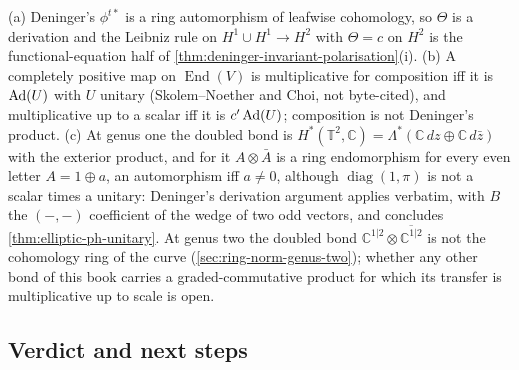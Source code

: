 \begin{proposition}
\label{prop:deninger-product-genus-one}
(a) Deninger's $\phi^{t*}$ is a ring automorphism of leafwise cohomology, so $\Theta$ is a derivation and the Leibniz
rule on $H^1\cup H^1\to H^2$ with $\Theta = c$ on $H^2$ is the functional-equation half of
\cref{thm:deninger-invariant-polarisation}(i). (b) A completely positive map on $\operatorname{End}(V)$ is
multiplicative for composition iff it is $\operatorname{Ad}(U)$ with $U$ unitary (Skolem--Noether and Choi, not byte-cited), and
multiplicative up to a scalar iff it is $c'\operatorname{Ad}(U)$; composition is not Deninger's product. (c) At genus one the
doubled bond is $H^*(\mathbb T^2,\mathbb C) = \Lambda^*(\mathbb C\,dz\oplus\mathbb C\,d\bar z)$ with the exterior product, and for it %
$A\otimes\bar A$ is a ring endomorphism for every even letter $A = 1\oplus a$, an automorphism iff $a\ne0$, although $\operatorname{diag}(1,\pi)$ is not
a scalar times a unitary: Deninger's derivation argument applies verbatim, with $B$ the $(-,-)$ coefficient of the
wedge of two odd vectors, and concludes \cref{thm:elliptic-ph-unitary}. At genus two the doubled bond
$\mathbb C^{1|2}\otimes\overline{\mathbb C^{1|2}}$ is not the cohomology ring of the curve (\cref{sec:ring-norm-genus-two}); whether any other bond
of this book carries a graded-commutative product for which its transfer is multiplicative up to scale is open.
\end{proposition}

\subsection{Verdict and next steps}

